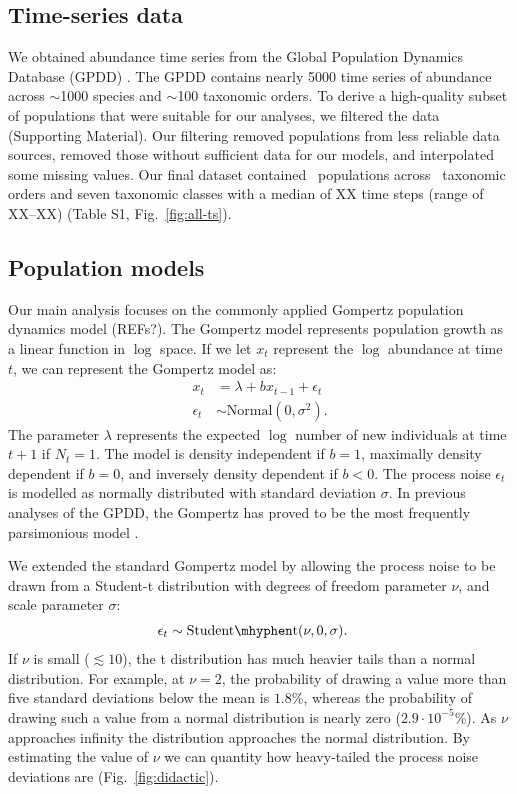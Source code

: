 \subsection{Time-series data}

We obtained abundance time series from the Global Population Dynamics Database
(GPDD) \citep{gpdd2010}. The GPDD contains nearly 5000 time series of abundance
across $\sim$1000 species and $\sim$100 taxonomic orders. To derive
a high-quality subset of populations that were suitable for our analyses, we
filtered the data (Supporting Material). Our filtering removed populations from
less reliable data sources, removed those without sufficient data for our
models, and interpolated some missing values. Our final dataset contained
\NPops~populations across \NOrders~taxonomic orders and seven taxonomic classes
with a median of XX time steps (range of XX--XX) (Table S1,
Fig.~\ref{fig:all-ts}).

\subsection{Population models}

Our main analysis focuses on the commonly applied Gompertz population dynamics
model (REFs?). The Gompertz model represents population growth as a linear
function in $\log$ space. If we let $x_t$ represent the $\log$ abundance at
time $t$, we can represent the Gompertz model as:
\begin{align*}
x_t &= \lambda + b x_{t-1} + \epsilon_t\\
\epsilon_t &\sim \mathrm{Normal}(0, \sigma^2).
\end{align*}
The parameter $\lambda$ represents the expected $\log$ number of new
individuals at time $t + 1$ if $N_t = 1$. The model is density independent if
$b = 1$, maximally density dependent if $b = 0$, and inversely density
dependent if $b < 0$. The process noise $\epsilon_t$ is modelled as normally
distributed with standard deviation $\sigma$. In previous analyses of the GPDD,
the Gompertz has proved to be the most frequently parsimonious model
\citep{brook2006}.

We extended the standard Gompertz model by allowing the process noise to be
drawn from a Student-t distribution with degrees of freedom parameter $\nu$,
and scale parameter $\sigma$:
\begin{align*}
\epsilon_t &\sim \mathrm{Student\mhyphen t}(\nu, 0, \sigma).
\end{align*}
If $\nu$ is small ($\lesssim 10$), the t distribution has much heavier tails
than a normal distribution. For example, at $\nu = 2$, the probability of
drawing a value more than five standard deviations below the mean is $1.8$\%,
whereas the probability of drawing such a value from a normal distribution is
nearly zero ($2.9\cdot10^{-5}$\%). As $\nu$ approaches infinity the
distribution approaches the normal distribution. By estimating the value of
$\nu$ we can quantity how heavy-tailed the process noise deviations are
(Fig.~\ref{fig:didactic}).

